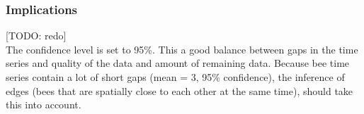 \subsubsection{Implications}
[TODO: redo]\\
The confidence level is set to 95\%.
This a good balance between gaps in the time series and quality of the data and amount of remaining data.
Because bee time series contain a lot of short gaps (mean = 3, 95\% confidence), the inference of edges (bees that are spatially close to each other at the same time), should take this into account.